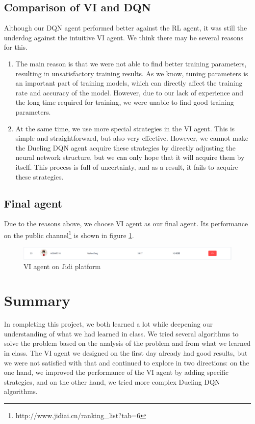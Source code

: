 \documentclass{article}
\begin{document}
\subsection{Comparison of VI and DQN}

Although our DQN agent performed better against the RL agent, it was still the underdog against the intuitive VI agent. We think there may be several reasons for this.
\begin{enumerate}
    \item The main reason is that we were not able to find better training parameters, resulting in unsatisfactory training results. As we know, tuning parameters is an important part of training models, which can directly affect the training rate and accuracy of the model. However, due to our lack of experience and the long time required for training, we were unable to find good training parameters.
    \item At the same time, we use more special strategies in the VI agent. This is simple and straightforward, but also very effective. However, we cannot make the Dueling DQN agent acquire these strategies by directly adjusting the neural network structure, but we can only hope that it will acquire them by itself. This process is full of uncertainty, and as a result, it fails to acquire these strategies.
\end{enumerate}

\subsection{Final agent}
Due to the reasons above, we choose VI agent as our final agent. Its performance on the public channel\footnote{http://www.jidiai.cn/ranking\_list?tab=6} is shown in figure \ref{jidi_vi}.
\begin{figure}[H]
  \centering
  \includegraphics[width=1\textwidth]{figs/vi_on_jidi.png}
  \caption{VI agent on Jidi platform}
  \label{jidi_vi}
\end{figure}

\section{Summary}

In completing this project, we both learned a lot while deepening our understanding of what we had learned in class. We tried several algorithms to solve the problem based on the analysis of the problem and from what we learned in class. The VI agent we designed on the first day already had good results, but we were not satisfied with that and continued to explore in two directions: on the one hand, we improved the performance of the VI agent by adding specific strategies, and on the other hand, we tried more complex Dueling DQN algorithms.
\end{document}
